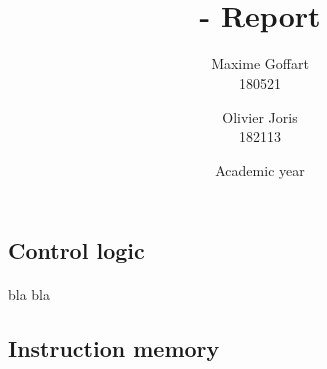 \documentclass[a4paper, 10pt, oneside]{article}
\title{\ClassName\\\vspace*{0.8cm}\ProjectName - Report\vspace{1cm}}
\author{Maxime Goffart \\180521 \and Olivier Joris\\182113}
\date{\vspace{1cm}Academic year \AcademicYear}
\begin{document}
\begin{titlingpage}
{\let\newpage\relax\maketitle}
\end{titlingpage}

\thispagestyle{empty}
\newpage


\subsection*{Control logic}
\paragraph{}bla bla

\subsection*{Instruction memory}
\end{document}
